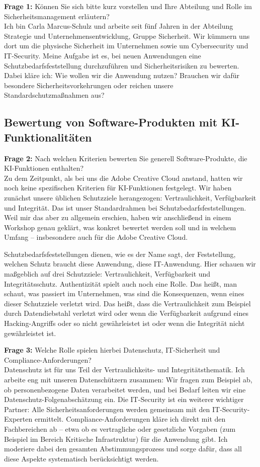 \documentclass[
    12pt, 
    a4paper,
    ]{scrartcl} %
\begin{document}
\textbf{Frage 1:} Können Sie sich bitte kurz vorstellen und Ihre Abteilung und Rolle im Sicherheitsmanagement erläutern? \\[0.5em]
Ich bin Carla Marcus-Schulz und arbeite seit fünf Jahren in der Abteilung Strategie und Unternehmensentwicklung, Gruppe Sicherheit. Wir kümmern uns dort um die physische Sicherheit im Unternehmen sowie um Cybersecurity und IT-Security. Meine Aufgabe ist es, bei neuen Anwendungen eine Schutzbedarfsfeststellung durchzuführen und Sicherheitsrisiken zu bewerten. Dabei kläre ich: Wie wollen wir die Anwendung nutzen? Brauchen wir dafür besondere Sicherheitsvorkehrungen oder reichen unsere Standardschutzmaßnahmen aus?

\subsection*{Bewertung von Software-Produkten mit KI-Funktionalitäten}

\textbf{Frage 2:} Nach welchen Kriterien bewerten Sie generell Software-Produkte, die KI-Funktionen enthalten? \\[0.5em]
Zu dem Zeitpunkt, als bei uns die Adobe Creative Cloud anstand, hatten wir noch keine spezifischen Kriterien für KI-Funktionen festgelegt. Wir haben zunächst unsere üblichen Schutzziele herangezogen: Vertraulichkeit, Verfügbarkeit und Integrität. Das ist unser Standardrahmen bei Schutzbedarfsfeststellungen. Weil mir das aber zu allgemein erschien, haben wir anschließend in einem Workshop genau geklärt, was konkret bewertet werden soll und in welchem Umfang – insbesondere auch für die Adobe Creative Cloud. 

Schutzbedarfsfeststellungen dienen, wie es der Name sagt, der Feststellung, welchen Schutz braucht diese Anwendung, diese IT-Anwendung. Hier schauen wir maßgeblich auf drei Schutzziele: Vertraulichkeit, Verfügbarkeit und Integritätsschutz. Authentizität spielt auch noch eine Rolle. Das heißt, man schaut, was passiert im Unternehmen, was sind die Konsequenzen, wenn eines dieser Schutzziele verletzt wird. Das heißt, dass die Vertraulichkeit zum Beispiel durch Datendiebstahl verletzt wird oder wenn die Verfügbarkeit aufgrund eines Hacking-Angriffs oder so nicht gewährleistet ist oder wenn die Integrität nicht gewährleistet ist.

\textbf{Frage 3:} Welche Rolle spielen hierbei Datenschutz, IT-Sicherheit und Compliance-Anforderungen? \\[0.5em]
Datenschutz ist für uns Teil der Vertraulichkeits- und Integritätsthematik. Ich arbeite eng mit unseren Datenschützern zusammen: Wir fragen zum Beispiel ab, ob personenbezogene Daten verarbeitet werden, und bei Bedarf leiten wir eine Datenschutz-Folgenabschätzung ein. Die IT-Security ist ein weiterer wichtiger Partner: Alle Sicherheitsanforderungen werden gemeinsam mit den IT-Security-Experten ermittelt. Compliance-Anforderungen kläre ich direkt mit den Fachbereichen ab – etwa ob es vertragliche oder gesetzliche Vorgaben (zum Beispiel im Bereich Kritische Infrastruktur) für die Anwendung gibt. Ich moderiere dabei den gesamten Abstimmungsprozess und sorge dafür, dass all diese Aspekte systematisch berücksichtigt werden.
\end{document}
